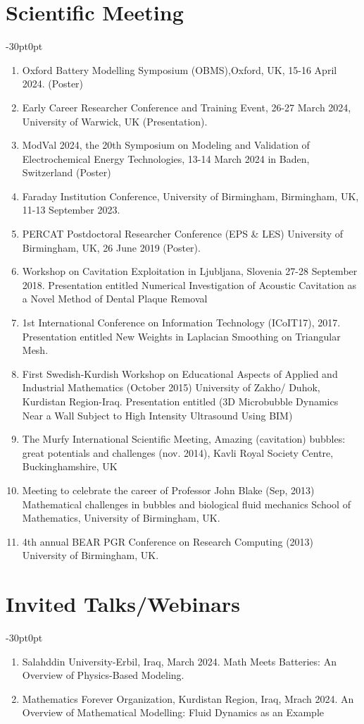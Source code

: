 \documentclass[line]{res}
\newenvironment{p1}
{\begin{adjustwidth}{-30pt}{0pt}
\vspace{8pt}}
{\end{adjustwidth}}
\begin{document}
\begin{resume}
\section{Scientific Meeting}
\begin{p1}
	\begin{enumerate}
 \item Oxford Battery Modelling Symposium (OBMS),Oxford, UK, 15-16 April 2024. (Poster)
		\item Early Career Researcher Conference and Training Event, 26-27 March 2024, University of Warwick, UK (Presentation).
		\item ModVal 2024, the 20th Symposium on Modeling and Validation of Electrochemical Energy Technologies, 13-14 March 2024 in Baden, Switzerland (Poster)
		\item Faraday Institution Conference, University of Birmingham, Birmingham, UK, 11-13 September 2023.
		\item PERCAT Postdoctoral Researcher Conference (EPS \& LES) University of Birmingham, UK, 26 June 2019 (Poster).
		\item Workshop on Cavitation Exploitation in Ljubljana, Slovenia 27-28 September 2018. Presentation entitled Numerical Investigation of Acoustic Cavitation as a Novel Method of Dental Plaque Removal 
		\item 1st International Conference on Information Technology (ICoIT17), 2017. Presentation entitled New Weights in Laplacian Smoothing on Triangular Mesh.
		\item First Swedish-Kurdish Workshop on Educational Aspects of Applied and Industrial Mathematics (October 2015) University of Zakho/ Duhok, Kurdistan Region-Iraq. Presentation entitled (3D Microbubble Dynamics Near a Wall Subject to High Intensity Ultrasound Using BIM) 
		\item The Murfy International Scientific Meeting, Amazing (cavitation) bubbles: great potentials and challenges (nov. 2014), Kavli Royal Society Centre, Buckinghamshire, UK
		\item Meeting to celebrate the career of Professor John Blake (Sep, 2013) Mathematical challenges in bubbles and biological fluid mechanics School of Mathematics, University of Birmingham, UK.
		\item 4th annual BEAR PGR Conference on Research Computing (2013) University of Birmingham, UK.
	\end{enumerate}
	\end{p1}


	\section{Invited Talks/Webinars}
	\begin{p1}
		\begin{enumerate}
			\item Salahddin University-Erbil, Iraq, March 2024. Math Meets Batteries: An Overview of Physics-Based Modeling.
			\item Mathematics Forever Organization, Kurdistan Region, Iraq, Mrach 2024. An Overview of Mathematical Modelling: Fluid Dynamics as an Example
			

\end{enumerate}
\end{p1}
\end{resume}
\end{document}

